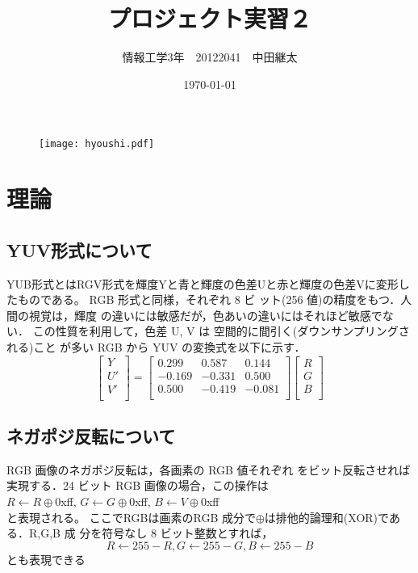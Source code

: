\documentclass[a4j]{jsarticle}
\title{プロジェクト実習２}
\author{情報工学3年　20122041　中田継太}
\date{\today}
\begin{document}
\thispagestyle{empty}

\begin{figure}
  \center
  \texttt{[image: hyoushi.pdf]}
\end{figure}

\clearpage
\setcounter{tocdepth}{2}
\tableofcontents
\clearpage
\twocolumn

\section{理論　\cite{cite:riron}}
\subsection{YUV形式について}
YUB形式とはRGV形式を輝度Yと青と輝度の色差Uと赤と輝度の色差Vに変形したものである。
RGB 形式と同様，それぞれ 8 ビ
ット(256 値)の精度をもつ．人間の視覚は，輝度
の違いには敏感だが，色あいの違いにはそれほど敏感でない．
この性質を利用して，色差 U, V は
空間的に間引く(ダウンサンプリングされる)こと
が多い
RGB から YUV の変換式を以下に示す．
\begin{equation}\label{equ:yuv}
  \begin{bmatrix}
Y \\
U' \\
V' \\
\end{bmatrix}
=
  \begin{bmatrix}
    0.299 &　0.587 &0.144\\
   -0.169 & -0.331 &0.500\\
    0.500 & -0.419 &-0.081\\
  \end{bmatrix}
  \begin{bmatrix}
    R\\
    G\\
    B\\
  \end{bmatrix}
\end{equation}
\subsection{ネガポジ反転について}
RGB 画像のネガポジ反転は，各画素の RGB 値それぞれ
をビット反転させれば実現する．24 ビット RGB
画像の場合，この操作は\\
$R←R\oplus0$xff, $G←G\oplus0$xff, $B←V\oplus0$xff \\
と表現される。
ここでRGBは画素のRGB
成分で$\oplus$は排他的論理和(XOR)である．R,G,B 成
分を符号なし 8 ビット整数とすれば，
\begin{equation}\label{equ:negaposi}
  R←255 -R, G←255 -G, B←255 -B
\end{equation}
とも表現できる
\end{document}
